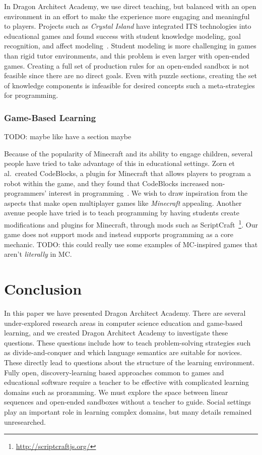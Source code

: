 \documentclass{sig-alternate}
\newcommand{\TODO}[1]{{\color{red} TODO: #1}}
\newcommand{\gametitle}{{\color{RoyalPurple} Dragon Architect Academy}}
\begin{document}
In \gametitle{}, we use direct teaching, but balanced with an open environment in an effort to make the experience more engaging and meaningful to players.
Projects such as \emph{Crystal Island} have integrated ITS technologies into educational games and found success with student knowledge modeling, goal recognition, and affect modeling~\cite{lester2013serious,rowe2010modeling}.
Student modeling is more challenging in games than rigid tutor environments, and this problem is even larger with open-ended games.
Creating a full set of production rules for an open-ended sandbox is not feasible since there are no direct goals.
Even with puzzle sections, creating the set of knowledge components is infeasible for desired concepts such a meta-strategies for programming.

\subsubsection{Game-Based Learning}
\TODO{maybe like have a section maybe}

Because of the popularity of Minecraft and its ability to engage children, several people have tried to take advantage of this in educational settings.
Zorn et al.\ created CodeBlocks, a plugin for Minecraft that allows players to program a robot within the game, and they found that CodeBlocks increased non-programmers' interest in programming~\cite{zorn2013minecraft}.
We wish to draw inpsiration from the aspects that make open multiplayer games like \emph{Minecraft} appealing.
Another avenue people have tried is to teach programming by having students create modifications and plugins for Minecraft, through mods such as ScriptCraft~\footnote{\url{http://scriptcraftjs.org/}}.
Our game does not support mods and instead supports programming as a core mechanic.
\TODO{this could really use some examples of MC-inspired games that aren't \emph{literally} in MC.}

\section{Conclusion}

In this paper we have presented \gametitle{}.
There are several under-explored research areas in computer science education and game-based learning, and we created \gametitle{} to investigate these questions.
These questions include how to teach problem-solving strategies such as divide-and-conquer and which language semantics are suitable for novices.
These directly lead to questions about the structure of the learning environment.
Fully open, discovery-learning based approaches common to games and educational software require a teacher to be effective with complicated learning domains such as proramming.
We must explore the space between linear sequences and open-ended sandboxes without a teacher to guide.
Social settings play an important role in learning complex domains, but many details remained unresearched.
\end{document}
